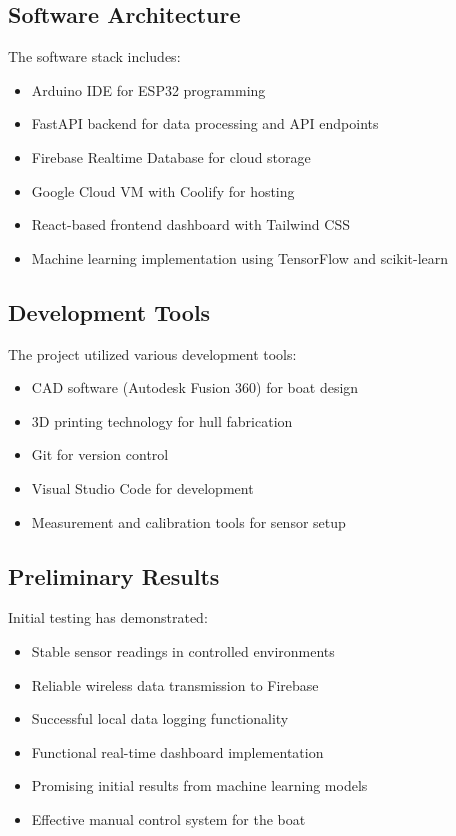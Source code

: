 \documentclass[conference]{IEEEtran}
\begin{document}
\subsection{Software Architecture}
The software stack includes:
\begin{itemize}
\item Arduino IDE for ESP32 programming
\item FastAPI backend for data processing and API endpoints
\item Firebase Realtime Database for cloud storage
\item Google Cloud VM with Coolify for hosting
\item React-based frontend dashboard with Tailwind CSS
\item Machine learning implementation using TensorFlow and scikit-learn
\end{itemize}

\subsection{Development Tools}
The project utilized various development tools:
\begin{itemize}
\item CAD software (Autodesk Fusion 360) for boat design
\item 3D printing technology for hull fabrication
\item Git for version control
\item Visual Studio Code for development
\item Measurement and calibration tools for sensor setup
\end{itemize}

\subsection{Preliminary Results}
Initial testing has demonstrated:
\begin{itemize}
\item Stable sensor readings in controlled environments
\item Reliable wireless data transmission to Firebase
\item Successful local data logging functionality
\item Functional real-time dashboard implementation
\item Promising initial results from machine learning models
\item Effective manual control system for the boat
\end{itemize}
\end{document}
